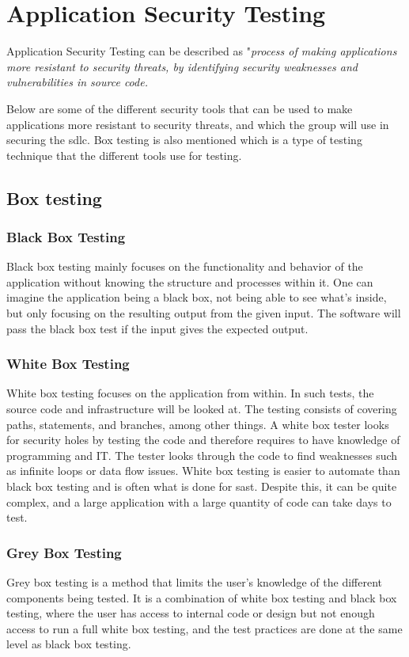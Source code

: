 \section{Application Security Testing}
Application Security Testing can be described as "\textit{process of making applications more resistant to security threats, by identifying security weaknesses and vulnerabilities in source code.}\cite{AST}

Below are some of the different security tools that can be used to make applications more resistant to security threats, and which the group will use in securing the \acrshort{sdlc}. Box testing is also mentioned which is a type of testing technique that the different tools use for testing.  

\subsection{Box testing}
\label{boxtesting}

\subsubsection{Black Box Testing}
Black box testing mainly focuses on the functionality and behavior of the application without knowing the structure and processes within it. One can imagine the application being a black box, not being able to see what's inside, but only focusing on the resulting output from the given input. The software will pass the black box test if the input gives the expected output. \cite{blackbox}

\subsubsection{White Box Testing}
White box testing focuses on the application from within. In such tests, the source code and infrastructure will be looked at. The testing consists of covering paths, statements, and branches, among other things. A white box tester looks for security holes by testing the code and therefore requires to have knowledge of programming and IT. The tester looks through the code to find weaknesses such as infinite loops or data flow issues. White box testing is easier to automate than black box testing and is often what is done for \acrlong{sast}. Despite this, it can be quite complex, and a large application with a large quantity of code can take days to test. \cite{whitebox}

\subsubsection{Grey Box Testing}
Grey box testing is a method that limits the user's knowledge of the different components being tested. It is a combination of white box testing and black box testing, where the user has access to internal code or design but not enough access to run a full white box testing, and the test practices are done at the same level as black box testing. \cite{GreyBox}


